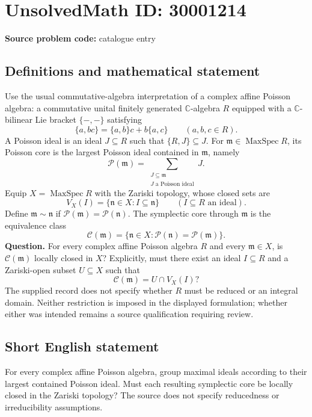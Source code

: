 \documentclass[11pt]{article}
\newcommand{\C}{\mathbb{C}}
\begin{document}
\section*{UnsolvedMath ID: 30001214}
\textbf{Source problem code:} catalogue entry
\subsection{Definitions and mathematical statement}
Use the usual commutative-algebra interpretation of a complex affine Poisson algebra: a commutative unital finitely generated \(\C\)-algebra \(R\) equipped with a \(\C\)-bilinear Lie bracket \(\{-,-\}\) satisfying
\[
\{a,bc\}=\{a,b\}c+b\{a,c\}\qquad(a,b,c\in R).
\]
A Poisson ideal is an ideal \(J\subseteq R\) such that \(\{R,J\}\subseteq J\). For \(\mathfrak m\in\operatorname{MaxSpec}R\), its Poisson core is the largest Poisson ideal contained in \(\mathfrak m\), namely
\[
\mathcal P(\mathfrak m)=\sum_{\substack{J\subseteq\mathfrak m\\J\text{ a Poisson ideal}}}J.
\]
Equip \(X=\operatorname{MaxSpec}R\) with the Zariski topology, whose closed sets are
\[
V_X(I)=\{\mathfrak n\in X:I\subseteq\mathfrak n\}\qquad(I\subseteq R\text{ an ideal}).
\]
Define \(\mathfrak m\sim\mathfrak n\) if \(\mathcal P(\mathfrak m)=\mathcal P(\mathfrak n)\). The symplectic core through \(\mathfrak m\) is the equivalence class
\[
\mathcal C(\mathfrak m)=\{\mathfrak n\in X:\mathcal P(\mathfrak n)=\mathcal P(\mathfrak m)\}.
\]
\textbf{Question.} For every complex affine Poisson algebra \(R\) and every \(\mathfrak m\in X\), is \(\mathcal C(\mathfrak m)\) locally closed in \(X\)? Explicitly, must there exist an ideal \(I\subseteq R\) and a Zariski-open subset \(U\subseteq X\) such that
\[
\mathcal C(\mathfrak m)=U\cap V_X(I)?
\]
The supplied record does not specify whether \(R\) must be reduced or an integral domain. Neither restriction is imposed in the displayed formulation; whether either was intended remains a source qualification requiring review.
\subsection{Short English statement}
For every complex affine Poisson algebra, group maximal ideals according to their largest contained Poisson ideal. Must each resulting symplectic core be locally closed in the Zariski topology? The source does not specify reducedness or irreducibility assumptions.
\end{document}
